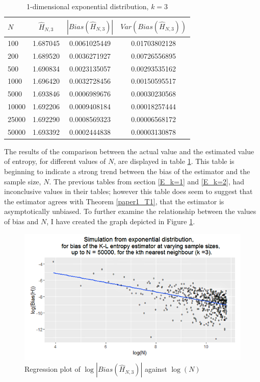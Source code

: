 \documentclass{report}
\begin{document}
\begin{table}
\caption{1-dimensional exponential distribution, $k=3$} \label{expo_k=3_table}
\begin{center}
\begin{tabular}{| l | c c c|} 
\toprule
$N$ & $\hat{H}_{N, 3}$ & $|Bias(\hat{H}_{N, 3})|$ & $Var(Bias(\hat{H}_{N, 3}))$ \\
\midrule[1pt]
100     & 1.687045     & 0.0061025449     & 0.01703802128  \\
200     & 1.689520     & 0.0036271927     & 0.00726556895  \\
500     & 1.690834     & 0.0023135057     & 0.00293535162  \\
1000    & 1.696420     & 0.0032728456     & 0.00150595517  \\
5000    & 1.693846     & 0.0006989676     & 0.00030230568  \\
10000   & 1.692206     & 0.0009408184     & 0.00018257444  \\
25000   & 1.692290     & 0.0008569323     & 0.00006568172  \\
50000   & 1.693392     & 0.0002444838     & 0.00003130878  \\
\hline
\end{tabular}
\end{center}
\end{table}

The results of the comparison between the actual value and the estimated value of entropy, for different values of $N$, are displayed in table \ref{expo_k=3_table}. This table is beginning to indicate a strong trend between the bias of the estimator and the sample size, $N$. The previous tables from section \ref{E_k=1} and \ref{E_k=2}, had inconclusive values in their tables; however this table does seem to suggest that the estimator agrees with Theorem \ref{paper1_T1}, that the estimator is asymptotically unbiased. To further examine the relationship between the values of bias and $N$, I have created the graph depicted in Figure \ref{expo_k=3_graph}.

\begin{figure}
  \begin{center}
    \includegraphics[width=\textwidth]{./Graphs/Expo_k=3_plot2.png}
  \end{center}
\caption{Regression plot of $\log|Bias(\hat{H}_{N, 3})|$ against $\log(N)$}
  \label{expo_k=3_graph}
\end{figure}
\end{document}
